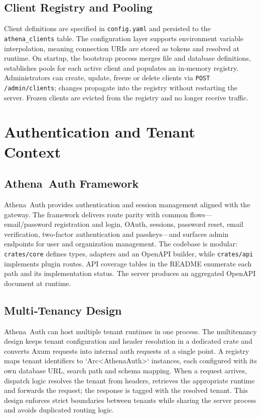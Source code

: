\documentclass[11pt,a4paper]{article}
\begin{document}
\subsection{Client Registry and Pooling}

Client definitions are specified in \texttt{config.yaml} and persisted to the \texttt{athena\_clients} table.  The configuration layer supports environment variable interpolation, meaning connection URIs are stored as tokens and resolved at runtime.  On startup, the bootstrap process merges file and database definitions, establishes pools for each active client and populates an in‑memory registry.  Administrators can create, update, freeze or delete clients via \texttt{POST /admin/clients}; changes propagate into the registry without restarting the server.  Frozen clients are evicted from the registry and no longer receive traffic.

\section{Authentication and Tenant Context}

\subsection{Athena Auth Framework}

Athena Auth provides authentication and session management aligned with the gateway.  The framework delivers route parity with common flows—email/password registration and login, OAuth, sessions, password reset, email verification, two‑factor authentication and passkeys—and surfaces admin endpoints for user and organization management.  The codebase is modular: \texttt{crates/core} defines types, adapters and an OpenAPI builder, while \texttt{crates/api} implements plugin routes.  API coverage tables in the README enumerate each path and its implementation status.  The server produces an aggregated OpenAPI document at runtime.

\subsection{Multi‑Tenancy Design}

Athena Auth can host multiple tenant runtimes in one process.  The multitenancy design keeps tenant configuration and header resolution in a dedicated crate and converts Axum requests into internal auth requests at a single point.  A registry maps tenant identifiers to `Arc<AthenaAuth>` instances, each configured with its own database URL, search path and schema mapping.  When a request arrives, dispatch logic resolves the tenant from headers, retrieves the appropriate runtime and forwards the request; the response is tagged with the resolved tenant.  This design enforces strict boundaries between tenants while sharing the server process and avoids duplicated routing logic.
\end{document}
